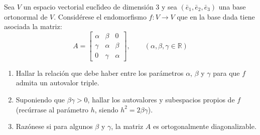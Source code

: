 \begin{enunciado}
 Sea $V$ un espacio vectorial eucl\'{\i}deo de dimensi\'on $3$ y sea $(\bar{e}_1, \bar{e}_2, \bar{e}_3)$ una base ortonormal de $V$.
 Consid\'erese el endomorfismo $f: V\to V$ que en la base dada tiene asociada la matriz:
 \begin{equation*}
  A = 
  \begin{bmatrix}
   \alpha & \beta  & 0      \\
   \gamma & \alpha & \beta  \\
   0      & \gamma & \alpha
  \end{bmatrix}, \qquad 
  \left( \alpha, \beta, \gamma \in \mathbb{R} \right)
 \end{equation*}
 \begin{enumerate}[$a$)]
  \item Hallar la relaci\'on que debe haber entre los par\'ametros $\alpha$, $\beta$ y $\gamma$ para que $f$ admita un autovalor triple.
  
  \item Suponiendo que $\beta\gamma > 0$, hallar los autovalores y subespacios propios de $f$ (rec\'urrase al par\'ametro $h$, siendo $h^2 = 2\beta\gamma$).
  
  \item Raz\'onese si para algunos $\beta$ y $\gamma$, la matriz $A$ es ortogonalmente diagonalizable.
 \end{enumerate}
\end{enunciado}
 
